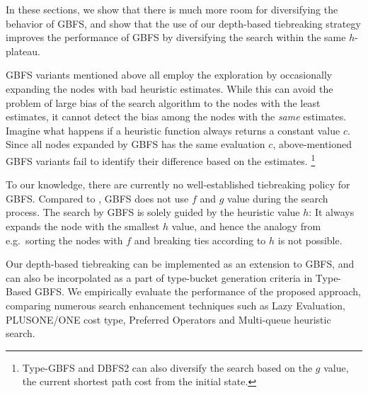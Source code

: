 In these sections, we show that there is much more room for diversifying
the behavior of GBFS, and show that the use of our depth-based
tiebreaking strategy improves the performance of GBFS by
diversifying the search within the same $h$-plateau.
 
GBFS variants mentioned above all employ the exploration by occasionally
expanding the nodes with bad heuristic estimates. While this can avoid
the problem of large bias of the search algorithm to the nodes with the
least estimates, it cannot detect the bias among the nodes with the
\emph{same} estimates. Imagine what happens if a heuristic function
always returns a constant value $c$. Since all nodes expanded by GBFS
has the same evaluation $c$, above-mentioned GBFS variants fail to
identify their difference based on the estimates. \footnote{Type-GBFS
and DBFS2 can also diversify the search based on the $g$ value, the
current shortest path cost from the initial state.}

To our knowledge, there are currently no well-established tiebreaking
policy for GBFS.  Compared to \astar, GBFS does not use $f$ and $g$
value during the search process.  The search by GBFS is solely guided by
the heuristic value $h$: It always expands the node with the smallest
$h$ value, and hence the analogy from \astar e.g.\ sorting the nodes
with $f$ and breaking ties according to $h$ is not possible.

Our depth-based tiebreaking can be implemented as an extension to GBFS, and
can also be incorpolated as a part of type-bucket generation criteria in
Type-Based GBFS.  We empirically evaluate the performance of the
proposed approach, comparing numerous search enhancement techniques such
as Lazy Evaluation, PLUS\-ONE/ONE cost type, Preferred Operators and
Multi-queue heuristic search.
